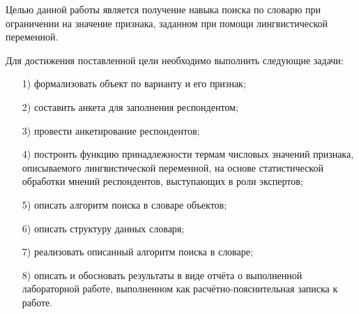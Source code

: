 

Целью данной работы является получение навыка поиска по словарю при ограничении на значение признака, заданном при помощи лингвистической переменной.

Для достижения поставленной цели необходимо выполнить следующие задачи:
\begin{enumerate}[itemindent=1em]
	\item[1)] формализовать объект по варианту и его признак;
	\item[2)] составить анкета для заполнения респондентом;
	\item[3)] провести анкетирование респондентов;
	\item[4)] построить функцию принадлежности термам числовых значений признака, описываемого лингвистической переменной, на основе статистической обработки мнений респондентов, выступающих в роли экспертов;
	\item[5)] описать алгоритм поиска в словаре объектов;
	\item[6)] описать структуру данных словаря;
	\item[7)] реализовать описанный алгоритм поиска в словаре;
	\item[8)] описать и обосновать результаты в виде отчёта о выполненной лабораторной работе, выполненном как расчётно-пояснительная записка к работе.
\end{enumerate}
\newpage
